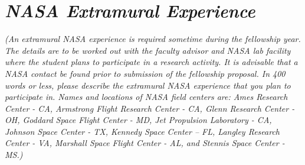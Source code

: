 \documentclass{article}
\begin{document}
\section{\emph{NASA Extramural Experience}} 

\small{\emph{(An extramural NASA experience is required sometime during the fellowship year. The details are to be worked out with the faculty advisor and NASA lab facility where the student plans to participate in a research activity. It is advisable that a NASA contact be found prior to submission of the fellowship proposal. In 400 words or less, please describe the extramural NASA experience that you plan to participate in. Names and locations of NASA field centers are: Ames Research Center - CA, Armstrong Flight Research Center - CA, Glenn Research Center - OH, Goddard Space Flight Center - MD, Jet Propulsion Laboratory - CA, Johnson Space Center - TX, Kennedy Space Center -- FL, Langley Research Center - VA, Marshall Space Flight Center - AL, and Stennis Space Center - MS.)}}
\\
\\
\end{document}
